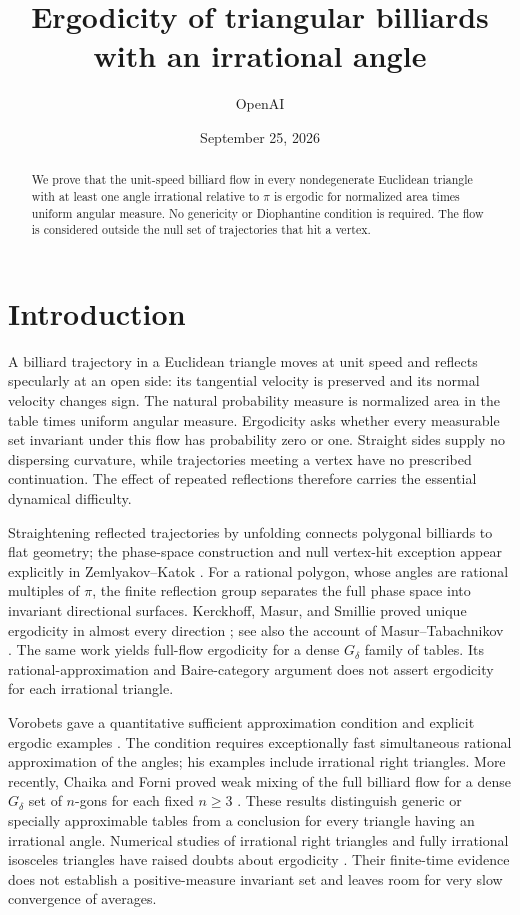 \documentclass[11pt]{article}
\title{Ergodicity of triangular billiards\\with an irrational angle}
\author{OpenAI}
\date{September 25, 2026}
\theoremstyle{remark}
\begin{document}
\maketitle

\begin{abstract}
We prove that the unit-speed billiard flow in every nondegenerate
Euclidean triangle with at least one angle irrational relative to
\(\pi\) is ergodic for normalized area times uniform angular measure.
No genericity or Diophantine condition is required. The flow is considered
outside the null set of trajectories that hit a vertex.
\end{abstract}

\section{Introduction}

A billiard trajectory in a Euclidean triangle moves at unit speed and
reflects specularly at an open side: its tangential velocity is preserved
and its normal velocity changes sign. The natural probability measure
is normalized area in the table times uniform angular measure.
Ergodicity asks whether every measurable set invariant under this flow
has probability zero or one. Straight sides supply no dispersing
curvature, while trajectories meeting a vertex have no prescribed
continuation. The effect of repeated reflections therefore carries the
essential dynamical difficulty.

Straightening reflected trajectories by unfolding connects polygonal
billiards to flat geometry; the phase-space construction and null
vertex-hit exception appear explicitly in Zemlyakov--Katok \cite{ZK}.
For a rational polygon, whose angles are rational multiples of \(\pi\),
the finite reflection group separates the full phase space into invariant
directional surfaces. Kerckhoff, Masur, and Smillie proved unique
ergodicity in almost every direction \cite{KMS}; see also the account of
Masur--Tabachnikov \cite[Sections~3.2 and~3.5]{MT}.
The same work yields full-flow ergodicity for a dense \(G_\delta\)
family of tables. Its rational-approximation and Baire-category argument
does not assert ergodicity for each irrational triangle.

Vorobets gave a quantitative sufficient approximation condition and
explicit ergodic examples \cite[Definition~1.3 and Theorem~1.1]{Vorobets}.
The condition requires exceptionally fast simultaneous rational
approximation of the angles; his examples include irrational right
triangles. More recently, Chaika and Forni proved weak mixing of the full
billiard flow for a dense \(G_\delta\) set of \(n\)-gons for each fixed
\(n\ge3\) \cite{CF}. These results distinguish generic
or specially approximable tables from a conclusion for every triangle
having an irrational angle. Numerical studies of irrational right
triangles and fully irrational isosceles triangles have raised doubts
about ergodicity \cite{WCP,ZSBJ}. Their finite-time evidence does not
establish a positive-measure invariant set and leaves room for very
slow convergence of averages.
\end{document}

